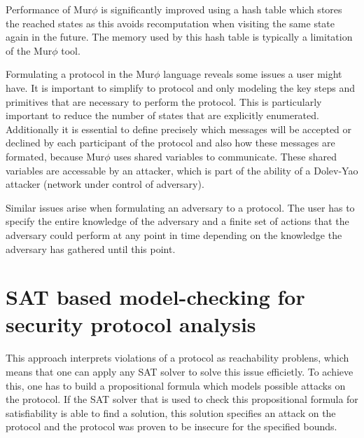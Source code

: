 \documentclass[a4paper,UKenglish]{lipics-v2018}
\def\murphi{Mur$\phi$ }
\begin{document}
Performance of \murphi is significantly improved using a hash table which stores the reached states as this avoids recomputation when visiting the same state again in the future. The memory used by this hash table is typically a limitation of the \murphi tool.\cite{murphi}

Formulating a protocol in the \murphi language reveals some issues a user might have. It is important to simplify to protocol and only modeling the key steps and primitives that are necessary to perform the protocol. This is particularly important to reduce the number of states that are explicitly enumerated. Additionally it is essential to define precisely which messages will be accepted or declined by each participant of the protocol and also how these messages are formated, because \murphi uses shared variables to communicate. These shared variables are accessable by an attacker, which is part of the ability of a Dolev-Yao attacker (network under control of adversary).\cite{murphi}

Similar issues arise when formulating an adversary to a protocol. The user has to specify the entire knowledge of the adversary and a finite set of actions that the adversary could perform at any point in time depending on the knowledge the adversary has gathered until this point.\cite{murphi}






\newpage
\section{SAT based model-checking for security protocol analysis}

This approach interprets violations of a protocol as reachability problens, which means that one can apply any SAT solver to solve this issue efficietly. To achieve this, one has to build a propositional formula which models possible attacks on the protocol. If the SAT solver that is used to check this propositional formula for satisfiability is able to find a solution, this solution specifies an attack on the protocol and the protocol was proven to be insecure for the specified bounds.\cite{sat}
\end{document}
